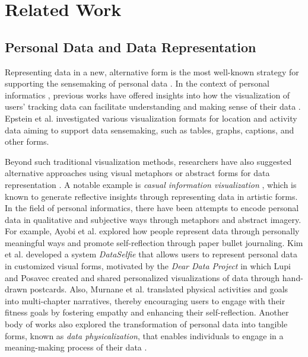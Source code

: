 \section{Related Work}
\subsection{Personal Data and Data Representation}
Representing data in a new, alternative form is the most well-known strategy for supporting the sensemaking of personal data \cite{jansen2015opportunities, choe2015characterizing}. In the context of personal informatics \cite{li2010stage,qself}, previous works have offered insights into how the visualization of users’ tracking data can facilitate understanding and making sense of their data \cite{choe2015characterizing, choe2017understanding,aseniero2020activity, huang2017field,mcduff2012affectaura}. Epstein et al. \cite{epstein2014taming} 
investigated various visualization formats for location and activity data aiming to support data sensemaking, such as tables, graphs, captions, and other forms.

Beyond such traditional visualization methods, researchers have also suggested alternative approaches using visual metaphors or abstract forms for data representation \cite{consolvo2008activity,pousman2007casual,murnane2020designing}. A notable example is \textit{casual information visualization} \cite{pousman2007casual}, which is known to generate reflective insights through representing data in artistic forms. In the field of personal informatics, there have been attempts to encode personal data in qualitative and subjective ways through metaphors and abstract imagery. For example, Ayobi et al. \cite{ayobi2018flexible} explored how people represent data through personally meaningful ways and promote self-reflection through paper bullet journaling. Kim et al. \cite{kim2019dataselfie} developed a system \textit{DataSelfie} that allows users to represent personal data in customized visual forms, motivated by the \textit{Dear Data Project} \cite{deardata} in which  Lupi and
Posavec created and shared personalized visualizations of data through hand-drawn postcards. Also, Murnane et al. \cite{murnane2020designing} translated physical activities and goals into multi-chapter narratives, thereby encouraging users to engage with their fitness goals by fostering empathy and enhancing their self-reflection. Another body of works also explored the transformation of personal data into tangible forms, known as \textit{data physicalization}, that enables individuals to engage in a meaning-making process of their data \cite{jansen2015opportunities,karyda2021data,thudt2018self,friske2020entangling}.

